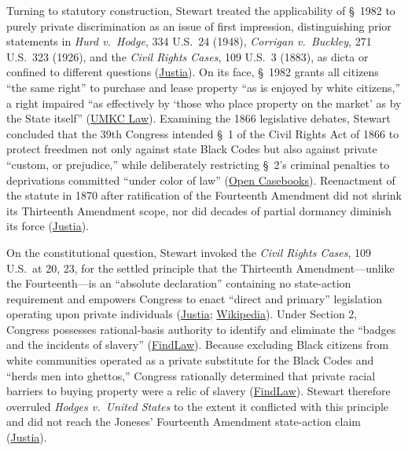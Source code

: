 \documentclass[12pt]{article}
\begin{document}
Turning to statutory construction, Stewart treated the applicability of \S~1982 to purely private discrimination as an issue of first impression, distinguishing prior statements in \textit{Hurd v.\ Hodge}, 334 U.S.\ 24 (1948), \textit{Corrigan v.\ Buckley}, 271 U.S.\ 323 (1926), and the \textit{Civil Rights Cases}, 109 U.S.\ 3 (1883), as dicta or confined to different questions (\href{https://supreme.justia.com/cases/federal/us/392/409/}{Justia}). On its face, \S~1982 grants all citizens ``the same right'' to purchase and lease property ``as is enjoyed by white citizens,'' a right impaired ``as effectively by `those who place property on the market' as by the State itself'' (\href{http://law2.umkc.edu/faculty/projects/ftrials/conlaw/mayer.html}{UMKC Law}). Examining the 1866 legislative debates, Stewart concluded that the 39th Congress intended \S~1 of the Civil Rights Act of 1866 to protect freedmen not only against state Black Codes but also against private ``custom, or prejudice,'' while deliberately restricting \S~2's criminal penalties to deprivations committed ``under color of law'' (\href{https://opencasebook.org/casebooks/6014-constitutional-law-ii/resources/2.3-jones-v-alfred-h-mayer-co/}{Open Casebooks}). Reenactment of the statute in 1870 after ratification of the Fourteenth Amendment did not shrink its Thirteenth Amendment scope, nor did decades of partial dormancy diminish its force (\href{https://supreme.justia.com/cases/federal/us/392/409/}{Justia}).

On the constitutional question, Stewart invoked the \textit{Civil Rights Cases}, 109 U.S.\ at 20, 23, for the settled principle that the Thirteenth Amendment---unlike the Fourteenth---is an ``absolute declaration'' containing no state-action requirement and empowers Congress to enact ``direct and primary'' legislation operating upon private individuals (\href{https://supreme.justia.com/cases/federal/us/392/409/}{Justia}; \href{https://en.wikipedia.org/wiki/Thirteenth_Amendment_to_the_United_States_Constitution}{Wikipedia}). Under Section 2, Congress possesses rational-basis authority to identify and eliminate the ``badges and the incidents of slavery'' (\href{https://constitution.findlaw.com/amendment13.html}{FindLaw}). Because excluding Black citizens from white communities operated as a private substitute for the Black Codes and ``herds men into ghettos,'' Congress rationally determined that private racial barriers to buying property were a relic of slavery (\href{https://constitution.findlaw.com/amendment13.html}{FindLaw}). Stewart therefore overruled \textit{Hodges v.\ United States} to the extent it conflicted with this principle and did not reach the Joneses' Fourteenth Amendment state-action claim (\href{https://supreme.justia.com/cases/federal/us/392/409/}{Justia}).
\end{document}
